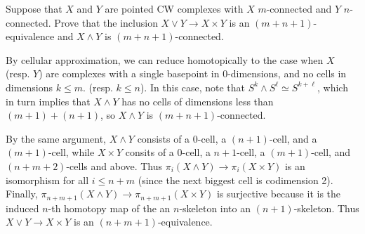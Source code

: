 \documentclass[11pt,letterpaper]{article}
\begin{document}
\begin{problem}
    Suppose that $X$ and $Y$ are pointed CW complexes with $X$ $m$-connected and $Y$ $n$-connected. Prove that the inclusion $X\vee Y \to X\times Y$ is an $(m+n+1)$-equivalence and $X\wedge Y$ is $(m+n+1)$-connected.
\end{problem}

\begin{solution}
    \quad By cellular approximation, we can reduce homotopically to the case when $X$ (resp. $Y$) are complexes with a single basepoint in $0$-dimensions, and no cells in dimensions $k\leq m$. (resp. $k\leq n$). In this case, note that $S^k\wedge S^\ell \simeq S^{k+\ell}$, which in turn implies that $X\wedge Y$ has no cells of dimensions less than $(m+1)+(n+1)$, so $X\wedge Y$ is $(m+n+1)$-connected.

    \quad By the same argument, $X\wedge Y$ consists of a $0$-cell, a $(n+1)$-cell, and a $(m+1)$-cell, while $X\times Y$ consits of a $0$-cell, a $n+1$-cell, a $(m+1)$-cell, and $(n+m+2)$-cells and above. Thus $\pi_i(X\wedge Y) \to \pi_i(X\times Y)$ is an isomorphism for all $i\leq n+m$ (since the next biggest cell is codimension 2). Finally, $\pi_{n+m+1}(X\wedge Y) \to \pi_{n+m+1}(X\times Y)$ is surjective because it is the induced $n$-th homotopy map of the an $n$-skeleton into an $(n+1)$-skeleton. Thus $X\vee Y \to X\times Y$ is an $(n+m+1)$-equivalence.    
\end{solution}
\end{document}
